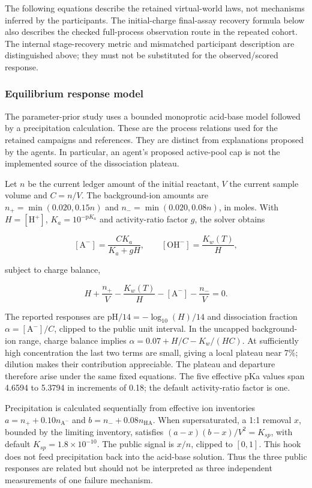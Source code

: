 \documentclass[10pt,a4paper]{article}
\begin{document}
The following equations describe the retained virtual-world laws, not mechanisms inferred by the participants. The initial-charge final-assay recovery formula below also describes the checked full-process observation route in the repeated cohort. The internal stage-recovery metric and mismatched participant description are distinguished above; they must not be substituted for the observed/scored response.

\subsubsection{Equilibrium response model}\label{equilibrium-response-model}

The parameter-prior study uses a bounded monoprotic acid-base model followed by a precipitation calculation. These are the process relations used for the retained campaigns and references. They are distinct from explanations proposed by the agents. In particular, an agent's proposed active-pool cap is not the implemented source of the dissociation plateau.

Let \(n\) be the current ledger amount of the initial reactant, \(V\) the current sample volume and \(C=n/V\). The background-ion amounts are \(n_+=\min(0.020,0.15n)\) and \(n_-=\min(0.020,0.08n)\), in moles. With \(H=[\mathrm{H}^+]\), \(K_a=10^{-\mathrm{p}K_a}\) and activity-ratio factor \(g\), the solver obtains

\[[\mathrm{A}^-]=\frac{CK_a}{K_a+gH},\qquad [\mathrm{OH}^-]=\frac{K_w(T)}{H},\]

subject to charge balance,

\[H+\frac{n_+}{V}-\frac{K_w(T)}{H}-[\mathrm{A}^-]-\frac{n_-}{V}=0.\]

The reported responses are \(\mathrm{pH}/14=-\log_{10}(H)/14\) and dissociation fraction \(\alpha=[\mathrm{A}^-]/C\), clipped to the public unit interval. In the uncapped background-ion range, charge balance implies \(\alpha=0.07+H/C-K_w/(HC)\). At sufficiently high concentration the last two terms are small, giving a local plateau near 7\%; dilution makes their contribution appreciable. The plateau and departure therefore arise under the same fixed equations. The five effective pKa values span 4.6594 to 5.3794 in increments of 0.18; the default activity-ratio factor is one.

Precipitation is calculated sequentially from effective ion inventories \(a=n_++0.10n_{\mathrm{A}^-}\) and \(b=n_-+0.08n_{\mathrm{HA}}\). When supersaturated, a 1:1 removal \(x\), bounded by the limiting inventory, satisfies \((a-x)(b-x)/V^2=K_{sp}\), with default \(K_{sp}=1.8\times10^{-10}\). The public signal is \(x/n\), clipped to \([0,1]\). This hook does not feed precipitation back into the acid-base solution. Thus the three public responses are related but should not be interpreted as three independent measurements of one failure mechanism.
\end{document}
